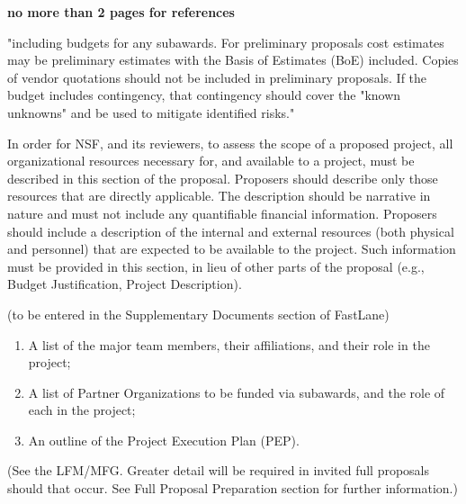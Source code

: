 \documentclass[oneside,11pt]{amsart}
\begin{document}
\vspace{-0.5cm}

{\bf no more than 2 pages for references}

\clearpage




\newpage


"including budgets for any subawards. For preliminary proposals cost
estimates may be preliminary estimates with the Basis of Estimates (BoE)
included. Copies of vendor quotations should not be included in
preliminary proposals. If the budget includes contingency, that
contingency should cover the "known unknowns" and be used to mitigate
identified risks."

\newpage


In order for NSF, and its reviewers, to assess the scope of a proposed
project, all organizational resources necessary for, and available to a
project, must be described in this section of the proposal. Proposers
should describe only those resources that are directly applicable. The
description should be narrative in nature and must not include any
quantifiable financial information. Proposers should include a
description of the internal and external resources (both physical and
personnel) that are expected to be available to the project.  Such
information must be provided in this section, in lieu of other parts of
the proposal (e.g., Budget Justification, Project Description).

\newpage


(to be entered in the Supplementary Documents section of FastLane)

\begin{enumerate}
%
\item A list of the major team members, their affiliations, and their
role in the project;
%
\item A list of Partner Organizations to be funded via subawards, and
the role of each in the project;
%
\item An outline of the Project Execution Plan (PEP).
\end{enumerate}

(See the LFM/MFG. Greater detail will be required in invited full
proposals should that occur. See Full Proposal Preparation section for
further information.)
\end{document}
